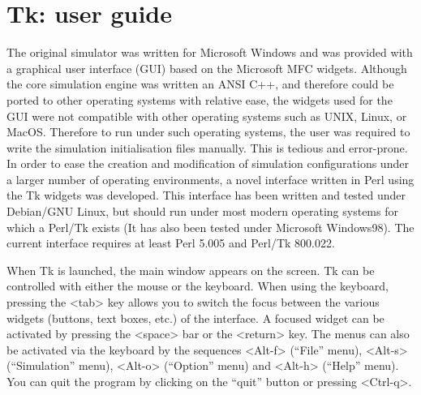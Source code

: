 \chapter{Tk\stochsim{}: user guide}

The original \stochsim{} simulator was written for Microsoft Windows and was
provided with a graphical user interface (GUI) based on the Microsoft MFC
widgets.  Although the core simulation engine was written an ANSI C++, and
therefore could be ported to other operating systems with relative ease, the
widgets used for the GUI were not compatible with other operating systems such
as UNIX, Linux, or MacOS.  Therefore to run \stochsim{} under such operating
systems, the user was required to write the simulation initialisation files
manually. This is tedious and error-prone. In order to ease the creation and
modification of simulation configurations under a larger number of operating
environments, a novel interface written in Perl using the Tk widgets was
developed. This interface has been written and tested under Debian/GNU Linux,
but should run under most modern operating systems for which a Perl/Tk exists
(It has also been tested under Microsoft Windows98). The current interface
requires at least Perl 5.005 and Perl/Tk 800.022. 

 When Tk\stochsim{} is
launched, the main window appears on the screen.  Tk\stochsim{} can be
controlled with either the mouse or the keyboard.  When using the keyboard,
pressing the <tab> key allows you to switch the focus between the various
widgets (buttons, text boxes, etc.) of the interface.  A focused widget can be
activated by pressing the <space> bar or the <return> key. The menus can also be
activated via the keyboard by the sequences \mbox{<Alt-f>} (``File'' menu),
\mbox{<Alt-s>} (``Simulation'' menu), \mbox{<Alt-o>} (``Option'' menu) and
\mbox{<Alt-h>} (``Help'' menu). You can quit the program by clicking on the
``quit'' button or pressing \mbox{<Ctrl-q>}.

